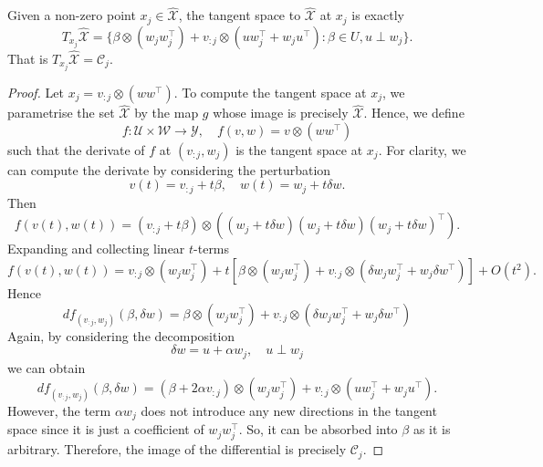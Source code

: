 \begin{proposition}\label{prop: tangent space to a point xj}
    Given a non-zero point $x_{j} \in \widehat{\mathcal{X}}$, the tangent space to $\widehat{\mathcal{X}}$ at $x_{j}$ is exactly
    \begin{equation}
        T_{x_{j}} \widehat{\mathcal{X}} = \{ \beta \otimes (w_{j} w_{j}^{\top}) + v_{:j} \otimes (uw_{j}^{\top} + w_{j}u^{\top}): \beta \in U, u \perp w_{j}\}.
    \end{equation}
    That is $T_{x_{j}} \widehat{\mathcal{X}} = \mathcal{C}_{j}$.
\end{proposition}

\begin{proof}
    Let $x_{j} = v_{:j} \otimes(ww^{\top})$.
    To compute the tangent space at $x_{j}$, we parametrise the set $\widehat{\mathcal X}$ by the map $g$ whose image is precisely $\widehat{\mathcal X}$.
    Hence, we define
    \begin{equation}
        f: \mathcal U \times \mathcal W \to \mathcal Y, \quad f(v,w)= v \otimes (ww^{\top})
    \end{equation}
    such that the derivate of $f$ at $(v_{:j},w_{j})$ is the tangent space at $x_{j}$.
    For clarity, we can compute the derivate by considering the perturbation
    \begin{equation}
        v(t) = v_{:j} + t\beta, \quad w(t) = w_{j} + t \delta w.
    \end{equation}
    Then
    \begin{equation*}
        f(v(t), w(t)) = (v_{:j} + t\beta) \otimes \left( (w_{j} + t \delta w) (w_{j} + t \delta w)(w_{j} + t \delta w)^{\top} \right).
    \end{equation*}
    Expanding and collecting linear $t$-terms
    \begin{equation*}
        f(v(t), w(t)) = v_{:j} \otimes (w_{j}w_{j}^{\top}) + t \left[ \beta \otimes (w_{j}w_{j}^{\top}) + v_{:j} \otimes (\delta w_{j}w_{j}^{\top} + w_{j} \delta w^{\top}) \right] + O(t^2).
    \end{equation*}
    Hence
    \begin{equation}
        d f_{(v_{:j},w_{j})}(\beta, \delta w) = \beta \otimes (w_{j}w_{j}^{\top}) + v_{:j} \otimes (\delta w_{j}w_{j}^{\top} + w_{j} \delta w^{\top})
    \end{equation}
    Again, by considering the decomposition
    \begin{equation}
        \delta w = u + \alpha w_{j}, \quad u \perp w_{j}
    \end{equation}
    we can obtain
    \begin{equation}
        d f_{(v_{:j},w_{j})}(\beta, \delta w) = (\beta + 2 \alpha v_{:j}) \otimes (w_{j}w_{j}^{\top}) + v_{:j} \otimes (uw_{j}^{\top} + w_{j} u^{\top}).    
    \end{equation}
    However, the term $\alpha w_{j}$ does not introduce any new directions in the tangent space since it is just a coefficient of $w_{j}w_{j}^{\top}$.
    So, it can be absorbed into $\beta$ as it is arbitrary.
    Therefore, the image of the differential is precisely $\mathcal{C}_{j}$.
\end{proof}

